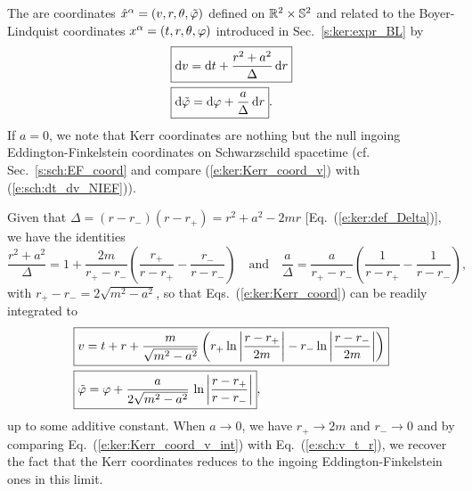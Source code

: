 The  are coordinates
$\hat{x}^\alpha = (v,r,\theta,{\tilde\varphi})$ defined on $\mathbb{R}^2\times\mathbb{S}^2$ and related to the Boyer-Lindquist coordinates
$x^\alpha = (t,r,\theta,\varphi)$ introduced in Sec.~\ref{s:ker:expr_BL} by
\begin{subequations}
\label{e:ker:Kerr_coord}
\begin{align}
& \fbox{$\displaystyle \mathrm{d} v = \mathrm{d} t + \frac{r^2+a^2}{\Delta} \, \mathrm{d} r$} \label{e:ker:Kerr_coord_v}\\
& \fbox{$\displaystyle \mathrm{d} {\tilde\varphi} = \mathrm{d} \varphi + \frac{a}{\Delta}\, \mathrm{d} r$} . \label{e:ker:Kerr_coord_tph}
\end{align}
\end{subequations}
If $a=0$, we note that Kerr coordinates are nothing but the null
ingoing Eddington-Finkelstein
coordinates on Schwarzschild spacetime (cf. Sec.~\ref{s:sch:EF_coord} and compare
(\ref{e:ker:Kerr_coord_v}) with (\ref{e:sch:dt_dv_NIEF})).

Given that $\Delta = (r-r_-)(r-r_+) = r^2+a^2 - 2mr$ [Eq.~(\ref{e:ker:def_Delta})], we have
the identities
\[
    \frac{r^2+a^2}{\Delta} = 1 + \frac{2m}{r_+-r_-} \left( \frac{r_+}{r-r_+}
        - \frac{r_-}{r-r_-} \right) \quad\mbox{and}\quad
     \frac{a}{\Delta} = \frac{a}{r_+-r_-} \left( \frac{1}{r-r_+}
        - \frac{1}{r-r_-} \right) ,
\]
with $r_+-r_- = 2\sqrt{m^2-a^2}$,
so that Eqs.~(\ref{e:ker:Kerr_coord}) can be readily integrated to
\begin{subequations}
\label{e:ker:Kerr_coord_int}
\begin{align}
& \fbox{$\displaystyle v = t + r + \frac{m}{\sqrt{m^2-a^2}} \left(
    r_+ \ln\left| \frac{r-r_+}{2m} \right|
    - r_- \ln\left| \frac{r-r_-}{2m} \right| \right) $}\label{e:ker:Kerr_coord_v_int}\\
& \fbox{$\displaystyle  {\tilde\varphi} = \varphi + \frac{a}{2\sqrt{m^2-a^2}}\, \ln \left|
    \frac{r-r_+}{r-r_-} \right| $} , \label{e:ker:Kerr_coord_tph_int}
\end{align}
\end{subequations}
up to some additive constant.
When $a\rightarrow 0$, we have $r_+\rightarrow 2m$ and $r_-\rightarrow 0$
and by comparing Eq.~(\ref{e:ker:Kerr_coord_v_int}) with Eq.~(\ref{e:sch:v_t_r}), we recover the fact
that the Kerr coordinates reduces to the ingoing Eddington-Finkelstein
ones in this limit.

